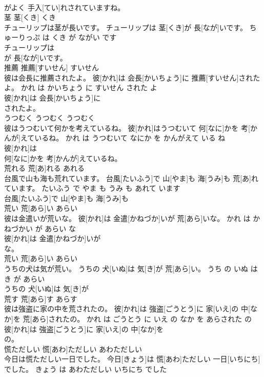 \documentclass[8pt]{extreport}
\begin{document}
\begin{CJK}{UTF8}{min}
\\	がよく 手入[てい]れされていますね。			
\\	茎	茎[くき]	くき	
\\	チューリップは茎が長いです。	チューリップは 茎[くき]が 長[なが]いです。	ちゅーりっぷ は くき が ながい です	
\\	チューリップは
\\	が 長[なが]いです。			
\\	推薦	推薦[すいせん]	すいせん	
\\	彼は会長に推薦されたよ。	彼[かれ]は 会長[かいちょう]に 推薦[すいせん]されたよ。	かれ は かいちょう に すいせん された よ	
\\	彼[かれ]は 会長[かいちょう]に
\\	されたよ。			
\\	うつむく	うつむく	うつむく	
\\	彼はうつむいて何かを考えているね。	彼[かれ]はうつむいて 何[なに]かを 考[かんが]えているね。	かれ は うつむいて なにか を かんがえて いる ね	
\\	彼[かれ]は
\\	何[なに]かを 考[かんが]えているね。			
\\	荒れる	荒[あ]れる	あれる	
\\	台風で山も海も荒れています。	台風[たいふう]で 山[やま]も 海[うみ]も 荒[あ]れています。	たいふう で やま も うみ も あれて います	
\\	台風[たいふう]で 山[やま]も 海[うみ]も
\\	荒い	荒[あら]い	あらい	
\\	彼は金遣いが荒いな。	彼[かれ]は 金遣[かねづか]いが 荒[あら]いな。	かれ は かねづかい が あらい な	
\\	彼[かれ]は 金遣[かねづか]いが
\\	な。			
\\	荒い	荒[あら]い	あらい	
\\	うちの犬は気が荒い。	うちの 犬[いぬ]は 気[き]が 荒[あら]い。	うち の いぬ は き が あらい	
\\	うちの 犬[いぬ]は 気[き]が
\\	荒す	荒[あら]す	あらす	
\\	彼は強盗に家の中を荒されたの。	彼[かれ]は 強盗[ごうとう]に 家[いえ]の 中[なか]を 荒[あら]されたの。	かれ は ごうとう に いえ の なか を あらされた の	
\\	彼[かれ]は 強盗[ごうとう]に 家[いえ]の 中[なか]を
\\	の。			
\\	慌ただしい	慌[あわ]ただしい	あわただしい	
\\	今日は慌ただしい一日でした。	今日[きょう]は 慌[あわ]ただしい 一日[いちにち]でした。	きょう は あわただしい いちにち でした	

\end{CJK}
\end{document}
